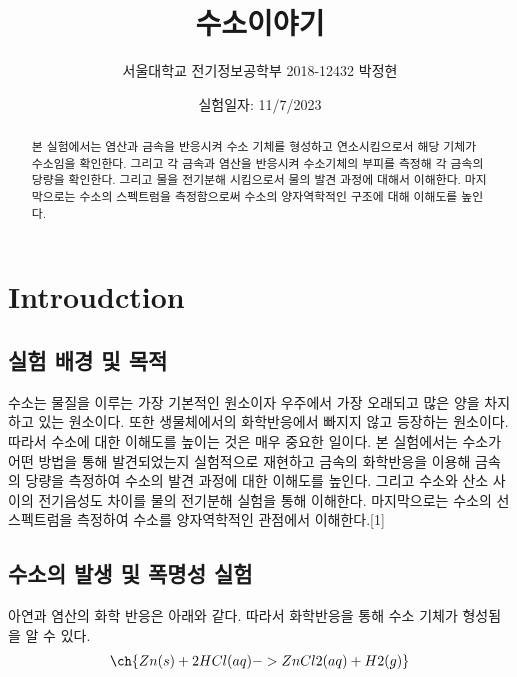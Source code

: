 \documentclass[%
 reprint,
 amsmath,amssymb,
 aps,
]{revtex4-2}
\begin{document}
\title{수소이야기}

\author{서울대학교 전기정보공학부 2018-12432 박정현}
\date{실험일자: 11/7/2023}%

\begin{abstract}
본 실험에서는 염산과 금속을 반응시켜 수소 기체를 형성하고 연소시킴으로서 해당 기체가 수소임을 확인한다. 그리고 각 금속과 염산을 반응시켜 수소기체의 부피를 측정해 각 금속의 당량을 확인한다. 그리고 물을 전기분해 시킴으로서 물의 발견 과정에 대해서 이해한다. 마지막으로는 수소의 스펙트럼을 측정함으로써 수소의 양자역학적인 구조에 대해 이해도를 높인다.
\end{abstract}

\maketitle


\section{\label{sec:level1}Introudction}
\subsection{\label{sec:level2}실험 배경 및 목적}
 수소는 물질을 이루는 가장 기본적인 원소이자 우주에서 가장 오래되고 많은 양을 차지하고 있는 원소이다. 또한 생물체에서의 화학반응에서 빠지지 않고 등장하는 원소이다. 따라서 수소에 대한 이해도를 높이는 것은 매우 중요한 일이다. 본 실험에서는 수소가 어떤 방법을 통해 발견되었는지 실험적으로 재현하고 금속의 화학반응을 이용해 금속의 당량을 측정하여 수소의 발견 과정에 대한 이해도를 높인다. 그리고 수소와 산소 사이의 전기음성도 차이를 물의 전기분해 실험을 통해 이해한다. 마지막으로는 수소의 선스펙트럼을 측정하여 수소를 양자역학적인 관점에서 이해한다.[1]

\subsection{\label{sec:level2}수소의 발생 및 폭명성 실험}
아연과 염산의 화학 반응은 아래와 같다. 따라서 화학반응을 통해 수소 기체가 형성됨을 알 수 있다.
\begin{align}
	\ch{Zn(s) + 2HCl(aq) ->ZnCl2(aq) + H2(g)}
\end{align}
\end{document}
